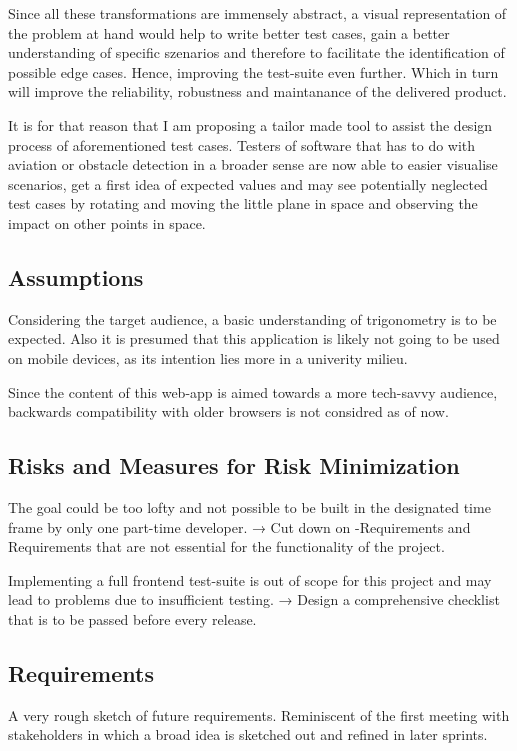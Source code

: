 Since all these transformations are immensely abstract, a visual representation of the problem at hand would help to write better test cases, gain a better understanding of specific szenarios and therefore to facilitate the identification of possible edge cases. Hence, improving the test-suite even further. Which in turn will improve the reliability, robustness and maintanance of the delivered product.

It is for that reason that I am proposing a tailor made tool to assist the design process of aforementioned test cases. Testers of software that has to do with aviation or obstacle detection in a broader sense are now able to easier visualise scenarios, get a first idea of expected values and may see potentially neglected test cases by rotating and moving the little plane in space and observing the impact on other points in space.

\subsection{Assumptions}
Considering the target audience, a basic understanding of trigonometry is to be expected. Also it is  presumed that this application is likely not going to be used on mobile devices, as its intention lies more in a univerity milieu.

Since the content of this web-app is aimed towards a more tech-savvy audience, backwards compatibility with older browsers is not considred as of now.

\subsection{Risks and Measures for Risk Minimization}
The goal could be too lofty and not possible to be built in the designated time frame by only one part-time developer. → Cut down on 
-Requirements and Requirements that are not essential for the functionality of the project.

Implementing a full frontend test-suite is out of scope for this project and may lead to problems due to insufficient testing. → Design a comprehensive checklist that is to be passed before every release.

\subsection{Requirements}
A very rough sketch of future requirements. Reminiscent of the first meeting with stakeholders in which a broad idea is sketched out and refined in later sprints.
